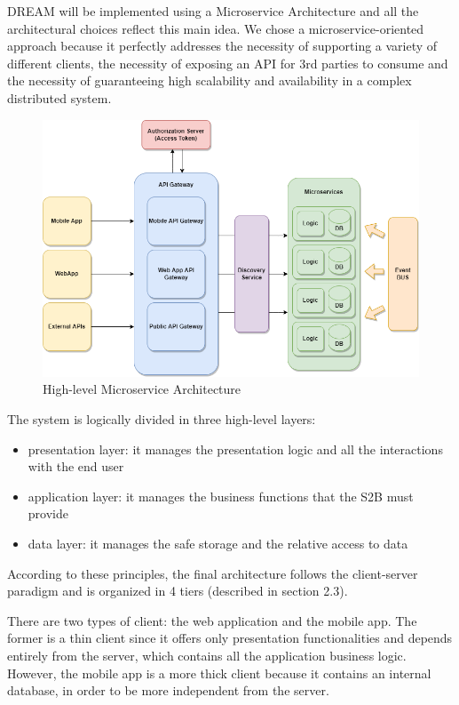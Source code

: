
DREAM will be implemented using a Microservice Architecture and all the architectural choices reflect this main idea. We chose a microservice-oriented approach because it perfectly addresses the necessity of supporting a variety of different clients, the necessity of exposing an API for 3rd parties to consume and the necessity of guaranteeing high scalability and availability in a complex distributed system.

\begin{figure}[H]
	\centering
    \includegraphics[scale=0.6]{Images/Architecture/Microservice Architecture Diagram.png}
	\caption{\label{fig:microservice_architecture}High-level Microservice Architecture}
\end{figure}

The system is logically divided in three high-level layers:
\begin{itemize} 
    \item presentation layer: it manages the presentation logic and all the interactions with the end user
    \item application layer: it manages the business functions that the S2B must provide
    \item data layer: it manages the safe storage and the relative access to data
\end{itemize}

According to these principles, the final architecture follows the client-server paradigm and is organized in 4 tiers (described in section 2.3). 
\newline

There are two types of client: the web application and the mobile app. The former is a thin client since it offers only presentation functionalities and depends entirely from the server, which contains all the application business logic. However, the mobile app is a more thick client because it contains an internal database, in order to be more independent from the server.
\newline


